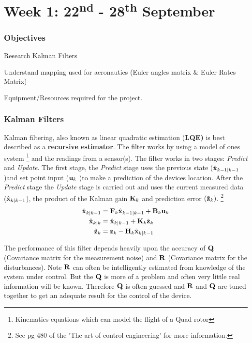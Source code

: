 \chapter{Week 1: 22\textsuperscript{nd} - 28\textsuperscript{th} September }

 \tocless\subsection{Objectives}

\begin{itemize*}
	\item Research Kalman Filters
	\item Understand mapping used for  aeronautics (Euler angles matrix \& Euler Rates Matrix)
	\item Equipment/Resources required for the project.
\end{itemize*}


 \tocless\subsection{Kalman Filters}

Kalman filtering, also known as linear quadratic estimation {(\bf LQE)} is best described as a {\bf recursive estimator}. The filter works by using a model of ones system \footnote{Kinematics equations which can model the flight of a Quad-rotor} and the readings from a sensor(s). The filter works in two stages:  \textit{Predict} and \textit{Update}. The first stage, the \textit{Predict} stage  uses the previous state ($\hat{\bf  x}_{k-1|k-1}$ )and set point input (${\bf u}_k$ )to make a prediction of the devices location. After the \textit{Predict} stage the \textit{Update} stage is carried out and uses the current measured data ($\hat{\bf x}_{k|k-1} $), the product of the Kalman gain $ {\bf K}_k $ and prediction error $(\tilde{\bf z}_k)$. \footnote{ See pg 480 of the 'The art of control engineering' for more information.}
\begin{align}
\hat{\bf x}_{k|k-1} & ={\bf F}_k\hat{\bf  x}_{k-1|k-1} + {\bf B}_k {\bf u}_k\\
\hat{\bf  x}_{k|k} & = \hat{\bf x}_{k|k-1} + {\bf K}_k \tilde{\bf z}_k\\
\tilde{\bf z}_k &= {\bf z}_k - {\bf H}_k\hat{\bf x}_{k|k-1} 
\end{align}

The performance of this filter depends heavily upon the accuracy of $\bf Q$ (Covariance matrix for the measurement noise) and $\bf R$ (Covariance matrix for the disturbances). Note $\bf R$ can often be intelligently estimated from knowledge of the system under control. But the $\bf Q$ is more of a problem and often very little real information will be known.  Therefore { $\bf Q$} is often guessed and $\bf R$ and $\bf Q$ are tuned together to get an adequate result for the control of the device.


